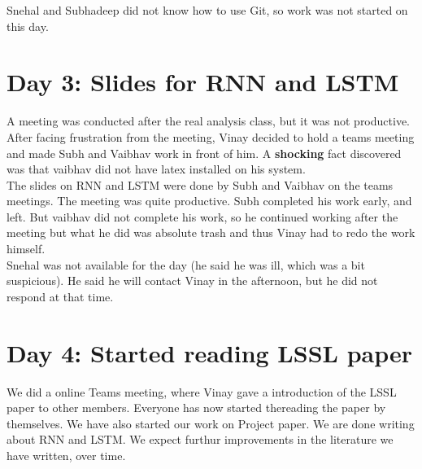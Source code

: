 \documentclass[11pt]{scrartcl}
\begin{document}
Snehal and Subhadeep did not know how to use Git, so work was not started on this day.

\section{Day 3: Slides for RNN and LSTM}
A meeting was conducted after the real analysis class, but it was not productive. \\

After facing frustration from the meeting, Vinay decided to hold a teams meeting and made Subh and Vaibhav work in front of him. A \textbf{shocking} fact discovered was that vaibhav did not have latex installed on his system. \\

The slides on RNN and LSTM were done by Subh and Vaibhav on the teams meetings. The meeting was quite productive. Subh completed his work early, and left. But vaibhav did not complete his work, so he continued working after the meeting but what he did was absolute trash and thus Vinay had to redo the work himself.\\

Snehal was not available for the day (he said he was ill, which was a bit suspicious). He said he will contact Vinay in the afternoon, but he did not respond at that time.


\section{Day 4: Started reading LSSL paper}
We did a online Teams meeting, where Vinay gave a introduction of the LSSL paper to other members. Everyone has now started thereading the paper by themselves.
We have also started our work on Project paper. We are done writing about RNN and LSTM. We expect furthur improvements in the literature we have written, over time.
\end{document}

